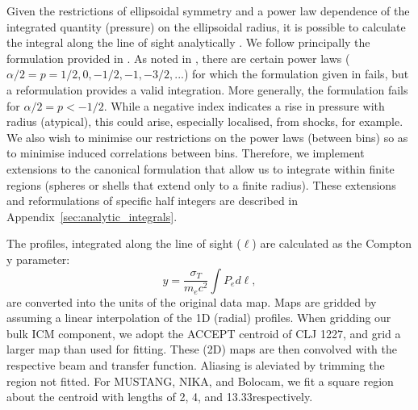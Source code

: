 \documentclass[twocolumn,traditabstract]{aa}
\begin{document}

Given the restrictions of ellipsoidal symmetry and a power law dependence of the integrated quantity (pressure) on the
ellipsoidal radius, it is possible to calculate the integral along the line of sight analytically
\citep[e.g.][]{vikhlinin2001a,korngut2011}. We follow
principally the formulation provided in \citet{korngut2011}. As noted in \citet{sarazin2016}, there are certain power
laws ($\alpha/2 = p = 1/2, 0 , -1/2, -1, -3/2, ...$) for which the formulation given in \citet{korngut2011} fails,
but a reformulation provides a valid integration. More generally, the formulation fails for $\alpha/2 = p < -1/2$.
While a negative index indicates a rise in pressure with radius (atypical), this could arise, especially localised,
from shocks, for example. We also wish to minimise our restrictions on the power laws (between bins) so as to minimise
induced correlations between bins. Therefore, we implement extensions to the canonical formulation that allow us to
integrate within finite regions (spheres or shells that extend only to a finite radius). These extensions and
reformulations of specific half integers are described in Appendix~\ref{sec:analytic_integrals}.

The profiles, integrated along the line of sight ($\ell$) are  calculated as the Compton y parameter:
\begin{equation}
  y = \frac{\sigma_T}{m_e c^2} \int P_e d\ell,
  \label{eqn:compton_y}
\end{equation}
are converted into the units of the original data map. Maps are gridded by assuming a linear interpolation
of the 1D (radial) profiles. When gridding our bulk ICM component, we adopt the ACCEPT centroid of CLJ 1227,
and grid a larger map than used for fitting.
These (2D) maps are then convolved with the respective beam and transfer function. Aliasing is aleviated by trimming
the region not fitted. For MUSTANG, NIKA, and Bolocam, we fit a square region about the centroid with lengths
of 2\amin, 4\amin, and 13.33\amin respectively.
\end{document}
